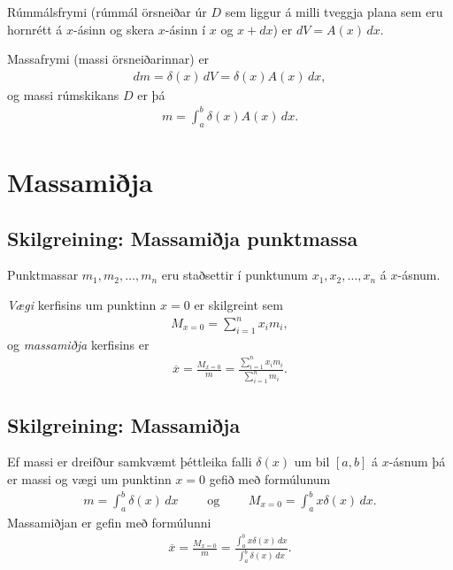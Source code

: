 \documentclass[a4paper,10pt,icelandic]{sphinxmanual}
\begin{document}
Rúmmálsfrymi (rúmmál örsneiðar úr \(D\) sem liggur á milli tveggja
plana sem eru hornrétt á \(x\)-ásinn og skera \(x\)-ásinn í
\(x\) og \(x+dx\)) er \(dV=A(x)\, dx\).

Massafrymi (massi örsneiðarinnar) er
\begin{equation*}
\begin{split}dm=\delta(x)\, dV = \delta(x) A(x)\, dx,\end{split}
\end{equation*}
og massi rúmskikans \(D\) er þá
\begin{equation*}
\begin{split}m=\int_a^b \delta(x)A(x)\, dx.\end{split}
\end{equation*}

\section{Massamiðja}
\label{kafli07:index-13}\label{kafli07:massamija}

\subsection{Skilgreining: Massamiðja punktmassa}
\label{kafli07:skilgreining-massamija-punktmassa}
Punktmassar \(m_1, m_2, \ldots, m_n\) eru staðsettir í punktunum
\(x_1,
x_2, \ldots, x_n\) á \(x\)-ásnum.

\textit{Vægi} kerfisins um punktinn \(x=0\) er skilgreint sem
\begin{equation*}
\begin{split}M_{x=0}=\sum_{i=1}^n x_im_i,\end{split}
\end{equation*}
og \textit{massamiðja} kerfisins er
\begin{equation*}
\begin{split}\overline{x}=\frac{M_{x=0}}{m} = \frac{\sum_{i=1}^n x_im_i}{\sum_{i=1}^n m_i}.\end{split}
\end{equation*}

\subsection{Skilgreining: Massamiðja}
\label{kafli07:skilgreining-massamija}
Ef massi er dreifður samkvæmt þéttleika falli \(\delta(x)\) um bil
\([a, b]\) á \(x\)-ásnum þá er massi og vægi um punktinn
\(x=0\) gefið með formúlunum
\begin{equation*}
\begin{split}m=\int_a^b \delta(x)\,dx
\qquad\mbox{ og }\qquad
M_{x=0}= \int_a^b x\delta(x)\,dx.\end{split}
\end{equation*}
Massamiðjan er gefin með formúlunni
\begin{equation*}
\begin{split}\overline{x}=\frac{M_{x=0}}{m}   =
\frac{\int_a^b x\delta(x)\,dx}{\int_a^b \delta(x)\,dx}.\end{split}
\end{equation*}
\end{document}
